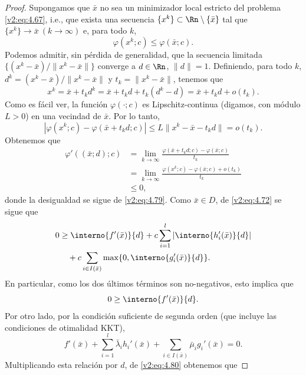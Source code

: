 \begin{proof}
    Supongamos que $\bar{x}$ no sea un minimizador local estricto del problema \eqref{v2:eq:4.67}, i.e., que exista una secuencia $\{x^k\} \subset \Rn \setminus \{\bar{x}\}$ tal que $\{x^k\} \to \bar{x} \ (k \to \infty)$ e, para todo $k$,
    \begin{equation}
        \varphi(x^k; c) \le \varphi(\bar{x}; c). \label{v2:eq:4.79}
    \end{equation}
    Podemos admitir, sin pérdida de generalidad, que la secuencia limitada $\{(x^k - \bar{x})/\|x^k - \bar{x}\|\}$ converge a $d \in \Rn$, $\|d\| = 1$. Definiendo, para todo $k$, $d^k = (x^k - \bar{x})/\|x^k - \bar{x}\|$ y $t_k = \|x^k - \bar{x}\|$, tenemos que
    \[
        x^k = \bar{x} + t_k d^k = \bar{x} + t_k d + t_k(d^k - d) = \bar{x} + t_k d + o(t_k).
    \]
    Como es fácil ver, la función $\varphi(\cdot; c)$ es Lipschitz-continua (digamos, con módulo $L > 0$) en una vecindad de $\bar{x}$. Por lo tanto,
    \[
        |\varphi(x^k; c) - \varphi(\bar{x} + t_k d; c)| \le L\|x^k - \bar{x} - t_k d\| = o(t_k).
    \]
    Obtenemos que
    \begin{align*}
        \varphi'((\bar{x}; d); c) &= \lim_{k \to \infty} \frac{\varphi(\bar{x} + t_k d; c) - \varphi(\bar{x}; c)}{t_k} \\
        &= \lim_{k \to \infty} \frac{\varphi(x^k; c) - \varphi(\bar{x}; c) + o(t_k)}{t_k} \\
        &\le 0,
    \end{align*}
    donde la desigualdad se sigue de \eqref{v2:eq:4.79}. Como $\bar{x} \in D$, de \eqref{v2:eq:4.72} se sigue que
    \begin{align}
        0 &\ge \interno{f'(\bar{x})}{d} + c\sum_{i=1}^l |\interno{h_i'(\bar{x})}{d}| \nonumber \\
        &\quad + c\sum_{i \in I(\bar{x})} \max\{0, \interno{g_i'(\bar{x})}{d}\}. \label{v2:eq:4.80}
    \end{align}
    En particular, como los dos últimos términos son no-negativos, esto implica que
    \begin{equation}
        0 \ge \interno{f'(\bar{x})}{d}. \label{v2:eq:4.81_extra}
    \end{equation}
    Por otro lado, por la condición suficiente de segunda orden (que incluye las condiciones de otimalidad KKT),
    \[
        f'(\bar{x}) + \sum_{i=1}^l \bar{\lambda}_i h_i'(\bar{x}) + \sum_{i \in I(\bar{x})} \bar{\mu}_i g_i'(\bar{x}) = 0.
    \]
    Multiplicando esta relación por $d$, de \eqref{v2:eq:4.80} obtenemos que

\end{proof}
